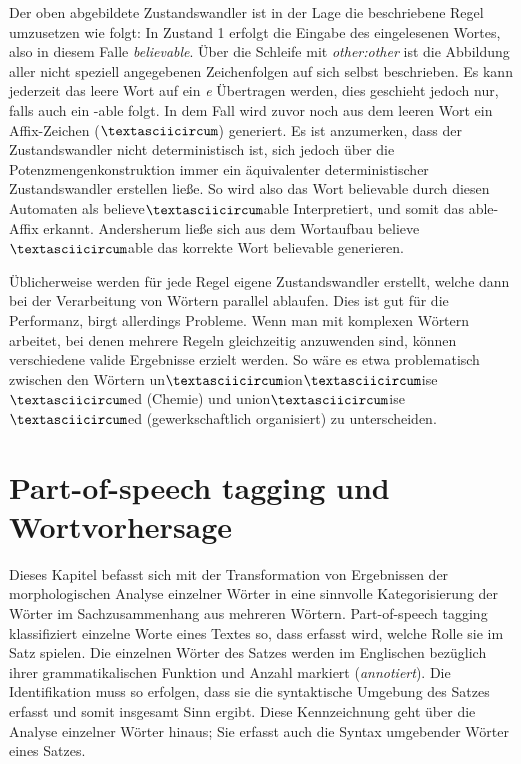 \documentclass[12pt]{report}
\begin{document}
Der oben abgebildete Zustandswandler ist in der Lage die beschriebene Regel umzusetzen wie folgt: In Zustand 1 erfolgt die Eingabe des eingelesenen Wortes, also in diesem Falle \textit{\glqq  believable\grqq{}}. Über die Schleife mit \textit{\glqq  other:other\grqq{}} ist die Abbildung aller nicht speziell angegebenen Zeichenfolgen auf sich selbst beschrieben. Es kann jederzeit das leere Wort auf ein \textit{\glqq  e\grqq{}} Übertragen werden, dies geschieht jedoch nur, falls auch ein \glqq  -able\grqq{} folgt. In dem Fall wird zuvor noch aus dem leeren Wort ein Affix-Zeichen ($\textasciicircum$) generiert. Es ist anzumerken, dass der Zustandswandler nicht deterministisch ist, sich jedoch über die Potenzmengenkonstruktion immer ein äquivalenter deterministischer Zustandswandler erstellen ließe. So wird also das Wort \glqq  believable\grqq{} durch diesen Automaten als \glqq  believe$\textasciicircum$able\grqq{} Interpretiert, und somit das \glqq  able\grqq{}-Affix erkannt. Andersherum ließe sich aus dem Wortaufbau \glqq  believe$\textasciicircum$able\grqq{} das korrekte Wort \glqq  believable\grqq{} generieren.

Üblicherweise werden für jede Regel eigene Zustandswandler erstellt, welche dann bei der Verarbeitung von Wörtern parallel ablaufen. Dies ist gut für die Performanz, birgt allerdings Probleme. Wenn man mit komplexen Wörtern arbeitet, bei denen mehrere Regeln gleichzeitig anzuwenden sind, können verschiedene valide Ergebnisse erzielt werden. So wäre es etwa problematisch zwischen den Wörtern \glqq  un$\textasciicircum$ion$\textasciicircum$ise$\textasciicircum$ed\grqq{} (Chemie) und \glqq  union$\textasciicircum$ise$\textasciicircum$ed\grqq{} (gewerkschaftlich organisiert) zu unterscheiden. 

\section[POS tagging und Wortvorhersage]{Part-of-speech tagging und \\Wortvorhersage}
Dieses Kapitel befasst sich mit der Transformation von Ergebnissen der morphologischen Analyse einzelner Wörter in eine sinnvolle Kategorisierung der Wörter im Sachzusammenhang aus mehreren Wörtern. Part-of-speech tagging klassifiziert einzelne Worte eines Textes so, dass erfasst wird, welche Rolle sie im Satz spielen. Die einzelnen Wörter des Satzes werden im Englischen bezüglich ihrer grammatikalischen Funktion und Anzahl markiert (\textit{annotiert}). Die Identifikation muss so erfolgen, dass sie die syntaktische Umgebung des Satzes erfasst und somit insgesamt Sinn ergibt. Diese Kennzeichnung geht über die Analyse einzelner Wörter hinaus; Sie erfasst auch die Syntax umgebender Wörter eines Satzes. 
\end{document}
